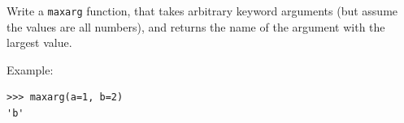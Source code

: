 \documentclass[english,serif,mathserif,xcolor=pdftex,dvipsnames,table]{beamer}
\begin{document}
\begin{frame}[fragile]
  \begin{exercise}
    Write a \texttt{maxarg} function, that takes arbitrary keyword
    arguments (but assume the values are all numbers), and returns the
    name of the argument with the largest value.

    \+
    Example:
\begin{lstlisting}
>>> maxarg(a=1, b=2)
'b'
\end{lstlisting}
  \end{exercise}
\end{frame}
\end{document}
